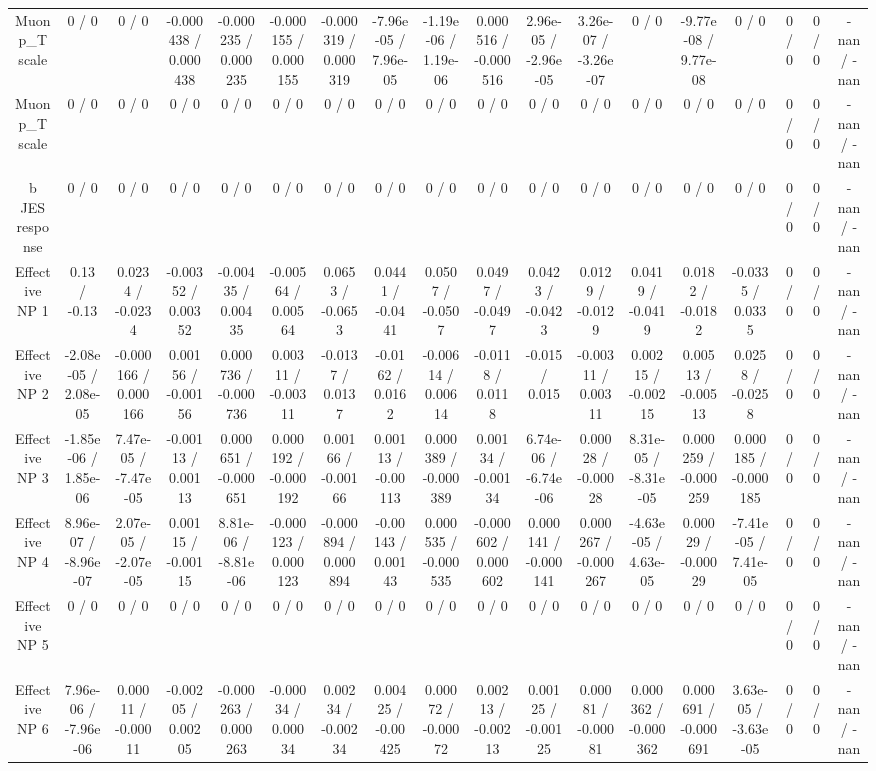 \documentclass[10pt]{article}
\begin{document}
\begin{table}[htbp]
\begin{center}
\begin{tabular}{|c|c|c|c|c|c|c|c|c|c|c|c|c|c|c|c|c|c|}
  Muon p_{T} scale & 0 / 0 & 0 / 0 & -0.000438 / 0.000438 & -0.000235 / 0.000235 & -0.000155 / 0.000155 & -0.000319 / 0.000319 & -7.96e-05 / 7.96e-05 & -1.19e-06 / 1.19e-06 & 0.000516 / -0.000516 & 2.96e-05 / -2.96e-05 & 3.26e-07 / -3.26e-07 & 0 / 0 & -9.77e-08 / 9.77e-08 & 0 / 0 & 0 / 0 & 0 / 0 & -nan / -nan \\ 
  Muon p_{T} scale & 0 / 0 & 0 / 0 & 0 / 0 & 0 / 0 & 0 / 0 & 0 / 0 & 0 / 0 & 0 / 0 & 0 / 0 & 0 / 0 & 0 / 0 & 0 / 0 & 0 / 0 & 0 / 0 & 0 / 0 & 0 / 0 & -nan / -nan \\ 
  b JES response & 0 / 0 & 0 / 0 & 0 / 0 & 0 / 0 & 0 / 0 & 0 / 0 & 0 / 0 & 0 / 0 & 0 / 0 & 0 / 0 & 0 / 0 & 0 / 0 & 0 / 0 & 0 / 0 & 0 / 0 & 0 / 0 & -nan / -nan \\ 
  Effective NP 1 & 0.13 / -0.13 & 0.0234 / -0.0234 & -0.00352 / 0.00352 & -0.00435 / 0.00435 & -0.00564 / 0.00564 & 0.0653 / -0.0653 & 0.0441 / -0.0441 & 0.0507 / -0.0507 & 0.0497 / -0.0497 & 0.0423 / -0.0423 & 0.0129 / -0.0129 & 0.0419 / -0.0419 & 0.0182 / -0.0182 & -0.0335 / 0.0335 & 0 / 0 & 0 / 0 & -nan / -nan \\ 
  Effective NP 2 & -2.08e-05 / 2.08e-05 & -0.000166 / 0.000166 & 0.00156 / -0.00156 & 0.000736 / -0.000736 & 0.00311 / -0.00311 & -0.0137 / 0.0137 & -0.0162 / 0.0162 & -0.00614 / 0.00614 & -0.0118 / 0.0118 & -0.015 / 0.015 & -0.00311 / 0.00311 & 0.00215 / -0.00215 & 0.00513 / -0.00513 & 0.0258 / -0.0258 & 0 / 0 & 0 / 0 & -nan / -nan \\ 
  Effective NP 3 & -1.85e-06 / 1.85e-06 & 7.47e-05 / -7.47e-05 & -0.00113 / 0.00113 & 0.000651 / -0.000651 & 0.000192 / -0.000192 & 0.00166 / -0.00166 & 0.00113 / -0.00113 & 0.000389 / -0.000389 & 0.00134 / -0.00134 & 6.74e-06 / -6.74e-06 & 0.00028 / -0.00028 & 8.31e-05 / -8.31e-05 & 0.000259 / -0.000259 & 0.000185 / -0.000185 & 0 / 0 & 0 / 0 & -nan / -nan \\ 
  Effective NP 4 & 8.96e-07 / -8.96e-07 & 2.07e-05 / -2.07e-05 & 0.00115 / -0.00115 & 8.81e-06 / -8.81e-06 & -0.000123 / 0.000123 & -0.000894 / 0.000894 & -0.00143 / 0.00143 & 0.000535 / -0.000535 & -0.000602 / 0.000602 & 0.000141 / -0.000141 & 0.000267 / -0.000267 & -4.63e-05 / 4.63e-05 & 0.00029 / -0.00029 & -7.41e-05 / 7.41e-05 & 0 / 0 & 0 / 0 & -nan / -nan \\ 
  Effective NP 5 & 0 / 0 & 0 / 0 & 0 / 0 & 0 / 0 & 0 / 0 & 0 / 0 & 0 / 0 & 0 / 0 & 0 / 0 & 0 / 0 & 0 / 0 & 0 / 0 & 0 / 0 & 0 / 0 & 0 / 0 & 0 / 0 & -nan / -nan \\ 
  Effective NP 6 & 7.96e-06 / -7.96e-06 & 0.00011 / -0.00011 & -0.00205 / 0.00205 & -0.000263 / 0.000263 & -0.00034 / 0.00034 & 0.00234 / -0.00234 & 0.00425 / -0.00425 & 0.00072 / -0.00072 & 0.00213 / -0.00213 & 0.00125 / -0.00125 & 0.00081 / -0.00081 & 0.000362 / -0.000362 & 0.000691 / -0.000691 & 3.63e-05 / -3.63e-05 & 0 / 0 & 0 / 0 & -nan / -nan \\ 

\end{tabular}
\end{center}
\end{table}
\end{document}
